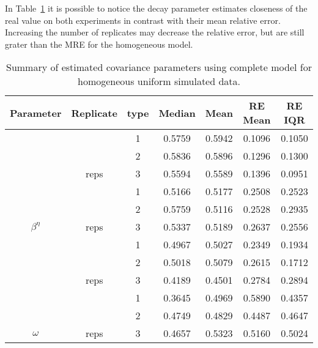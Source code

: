 In Table~\ref{tab:par-hu2comp} it is possible to notice the decay parameter estimates closeness of the real value on both experiments in contrast with their mean relative error. Increasing the number of replicates may decrease the relative error, but are still grater than the MRE for the homogeneous model. 

\begin{table}[b]\centering
\caption{Summary of estimated covariance parameters using complete model for homogeneous uniform simulated data.}
\begin{knitrout}
\color{fgcolor}
\begin{tabular}{ccccccc}
\toprule
Parameter & Replicate & type & Median & Mean & RE Mean & RE IQR\\
\midrule
 &  & 1 & 0.5759 & 0.5942 & 0.1096 & 0.1050\\

 &  & 2 & 0.5836 & 0.5896 & 0.1296 & 0.1300\\

 & \multirow{-3}{*}{\centering\arraybackslash 30 reps} & 3 & 0.5594 & 0.5589 & 0.1396 & 0.0951\\
\cmidrule{2-7}
 &  & 1 & 0.5166 & 0.5177 & 0.2508 & 0.2523\\

 &  & 2 & 0.5759 & 0.5116 & 0.2528 & 0.2935\\

\multirow{-6}{*}{\centering\arraybackslash $\beta^\eta$} & \multirow{-3}{*}{\centering\arraybackslash 5 reps} & 3 & 0.5337 & 0.5189 & 0.2637 & 0.2556\\
\cmidrule{1-7}
 &  & 1 & 0.4967 & 0.5027 & 0.2349 & 0.1934\\

 &  & 2 & 0.5018 & 0.5079 & 0.2615 & 0.1712\\

 & \multirow{-3}{*}{\centering\arraybackslash 30 reps} & 3 & 0.4189 & 0.4501 & 0.2784 & 0.2894\\
\cmidrule{2-7}
 &  & 1 & 0.3645 & 0.4969 & 0.5890 & 0.4357\\

 &  & 2 & 0.4749 & 0.4829 & 0.4487 & 0.4647\\

\multirow{-6}{*}{\centering\arraybackslash $\omega$} & \multirow{-3}{*}{\centering\arraybackslash 5 reps} & 3 & 0.4657 & 0.5323 & 0.5160 & 0.5024\\
\bottomrule
\end{tabular}


\end{knitrout}
\label{tab:par-hu2comp}
\end{table}


